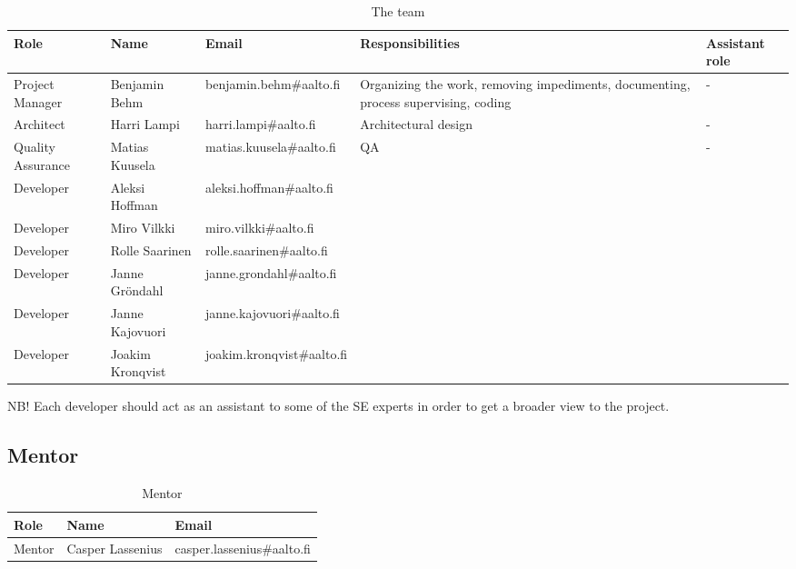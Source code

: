 \begin{table}[H]
\center
\begin{adjustwidth}{-1cm}{}
\begin{tabular}{|p{1.8cm}|p{3cm}|p{4.1cm}|p{4.1cm}|p{1.8cm}|} 
	
\hline %
\textbf{Role} & \textbf{Name} & \textbf{Email} & \textbf{Responsibilities} & 
\textbf{Assistant role} \\ 
\hline 
Project Manager & Benjamin Behm & benjamin.behm\#aalto.fi & Organizing the 
work, removing impediments, documenting, process supervising, coding & - \\ 
\hline
Architect & Harri Lampi & harri.lampi\#aalto.fi & Architectural design & - \\ 
\hline
Quality Assurance & Matias Kuusela & matias.kuusela\#aalto.fi & QA & - \\ 
\hline
Developer & Aleksi Hoffman & aleksi.hoffman\#aalto.fi & & \\
\hline
Developer & Miro Vilkki & miro.vilkki\#aalto.fi &  & \\
\hline
Developer & Rolle Saarinen & rolle.saarinen\#aalto.fi &  & \\
\hline
Developer & Janne Gröndahl & janne.grondahl\#aalto.fi & & \\
\hline
Developer & Janne Kajovuori & janne.kajovuori\#aalto.fi & & \\
\hline
Developer & Joakim Kronqvist & joakim.kronqvist\#aalto.fi & & \\
\hline

\end{tabular} %
\end{adjustwidth}
\caption{The team}
\label{table:Team}
\end{table}

NB! Each developer should act as an assistant to some of the SE experts in 
order to get a broader view to the project.


\subsection{Mentor}

\begin{table}[H]
\center
\begin{tabular}{|p{2cm}|p{3.8cm}|p{4.1cm}|} 

\hline 
\textbf{Role} & \textbf{Name} & \textbf{Email} \\ 
\hline
Mentor & Casper Lassenius & casper.lassenius\#aalto.fi \\
\hline
\end{tabular}
\caption{Mentor}
\label{table:Mentor}
\end{table}

